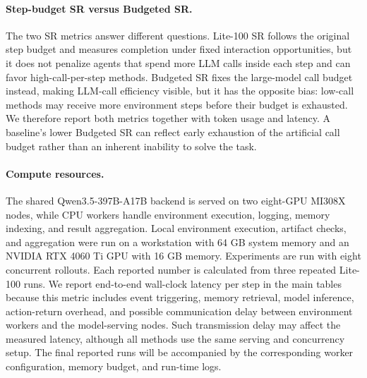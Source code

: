 \paragraph{Step-budget SR versus Budgeted SR.}
\label{sec:appendix_step_budget_vs_budgeted}
The two SR metrics answer different questions. Lite-100 SR follows the original
\stardojo{} step budget and measures completion under fixed interaction
opportunities, but it does not penalize agents that spend more LLM calls inside
each step and can favor high-call-per-step methods. Budgeted SR fixes the
large-model call budget instead, making LLM-call efficiency visible, but it has
the opposite bias: low-call methods may receive more environment steps before
their budget is exhausted. We therefore report both metrics together with token
usage and latency. A baseline's lower Budgeted SR can reflect early exhaustion
of the artificial call budget rather than an inherent inability to solve the
task.

\paragraph{Compute resources.}
\label{sec:appendix_compute_resources}
The shared Qwen3.5-397B-A17B backend is served on two eight-GPU MI308X nodes,
while CPU workers handle environment execution, logging, memory indexing, and
result aggregation. Local environment execution, artifact checks, and
aggregation were run on a workstation with 64 GB system memory and an NVIDIA
RTX 4060 Ti GPU with 16 GB memory. Experiments are run with eight concurrent
rollouts. Each reported number is calculated from three repeated Lite-100 runs.
We report end-to-end wall-clock latency per step in the main tables because
this metric includes event triggering, memory retrieval, model inference, action-return
overhead, and possible communication delay between environment workers and the
model-serving nodes. Such transmission delay may affect the measured latency,
although all methods use the same serving and concurrency setup. The final
reported runs will be accompanied by the corresponding worker configuration,
memory budget, and run-time logs.

